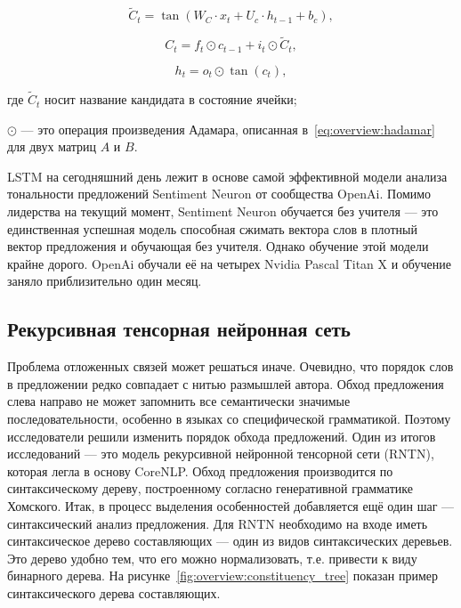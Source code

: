 \begin{equation}
  \label{eq:overview:lstm:cell_candidate}
  \tilde{C}_t = \tan(W_{C}\cdot{x_{t}} + U_{c}\cdot{h_{t-1}} + b_c),
\end{equation}

\begin{equation}
  \label{eq:overview:lstm:new_cell}
  C_t = f_t\odot{c_{t-1}} + i_t\odot{\tilde{C}_t},
\end{equation}

\begin{equation}
  \label{eq:overview:lstm:new_hidden}
  h_t = o_t\odot{\tan(c_t)},
\end{equation}
\begin{explanationx}
\item [где] $\tilde{C}_t$ носит название кандидата в состояние ячейки;
\item ${\odot}$ --- это операция произведения Адамара, описанная в~\ref{eq:overview:hadamar} для двух матриц $A$ и $B$.
\end{explanationx}

LSTM на сегодняшний день лежит в основе самой эффективной модели анализа тональности предложений Sentiment Neuron от сообщества OpenAi. Помимо лидерства на текущий момент, Sentiment Neuron обучается без учителя --- это единственная успешная модель способная сжимать вектора слов в плотный вектор предложения и обучающая без учителя. Однако обучение этой модели крайне дорого. OpenAi обучали её на четырех Nvidia Pascal Titan X и обучение заняло приблизительно один месяц.

\subsection{Рекурсивная тенсорная нейронная сеть}
Проблема отложенных связей может решаться иначе. Очевидно, что порядок слов в предложении редко совпадает с нитью размышлей автора. Обход предложения слева направо не может запомнить все семантически значимые последовательности, особенно в языках со специфической грамматикой. Поэтому исследователи решили изменить порядок обхода предложений. Один из итогов исследований --- это модель рекурсивной нейронной тенсорной сети (RNTN), которая легла в основу CoreNLP. Обход предложения производится по синтаксическому дереву, построенному согласно генеративной грамматике Хомского.
Итак, в процесс выделения особенностей добавляется ещё один шаг --- синтаксический анализ предложения. Для RNTN необходимо на входе иметь синтаксическое дерево составляющих --- один из видов синтаксических деревьев. Это дерево удобно тем, что его можно нормализовать, т.е. привести к виду бинарного дерева. На рисунке~\ref{fig:overview:constituency_tree} показан пример синтаксического дерева составляющих.


